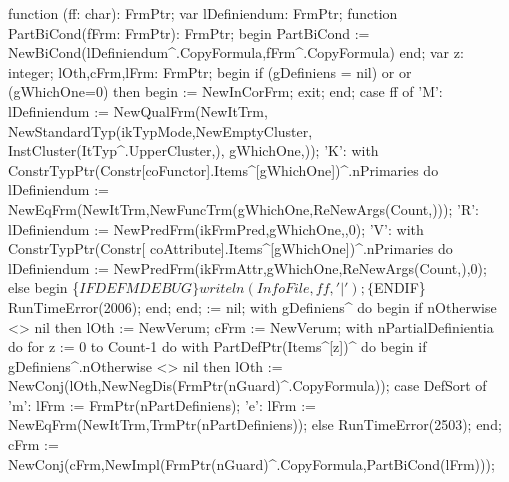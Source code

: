 \nwenddocs{}\endmoddef\nwstartdeflinemarkup{}\nwenddeflinemarkup
function (ff: char): FrmPtr;
var
   lDefiniendum: FrmPtr;
   function PartBiCond(fFrm: FrmPtr): FrmPtr;
   begin
      PartBiCond := NewBiCond(lDefiniendum^.CopyFormula,fFrm^.CopyFormula)
   end;
var
   z: integer;
   lOth,cFrm,lFrm: FrmPtr;
begin
   if (gDefiniens = nil) or  or (gWhichOne=0) then
   begin
       := NewInCorFrm;
      exit;
   end;
   case ff of
      'M':
         lDefiniendum := 
         NewQualFrm(NewItTrm,
                    NewStandardTyp(ikTypMode,NewEmptyCluster,
                                   InstCluster(ItTyp^.UpperCluster,),
                                   gWhichOne,));
      'K':
         with ConstrTypPtr(Constr[coFunctor].Items^[gWhichOne])^.nPrimaries do
         lDefiniendum := NewEqFrm(NewItTrm,NewFuncTrm(gWhichOne,ReNewArgs(Count,)));
      'R': lDefiniendum := NewPredFrm(ikFrmPred,gWhichOne,,0);
      'V':
         with ConstrTypPtr(Constr[ coAttribute].Items^[gWhichOne])^.nPrimaries do
         lDefiniendum := NewPredFrm(ikFrmAttr,gWhichOne,ReNewArgs(Count,),0);
      else
      begin
         \{$IFDEF MDEBUG\}
         writeln(InfoFile,ff,'|');
         \{$ENDIF\}
         RunTimeError(2006);
      end;
   end;
    := nil;
   with gDefiniens^ do
   begin
      if nOtherwise <> nil then lOth := NewVerum;
      cFrm := NewVerum;
      with nPartialDefinientia do
         for z := 0 to Count-1 do 
            with PartDefPtr(Items^[z])^ do
         begin
            if gDefiniens^.nOtherwise <> nil then
               lOth := NewConj(lOth,NewNegDis(FrmPtr(nGuard)^.CopyFormula));
            case DefSort of
               'm': lFrm := FrmPtr(nPartDefiniens);
               'e': lFrm := NewEqFrm(NewItTrm,TrmPtr(nPartDefiniens));
               else RunTimeError(2503);
            end;
            cFrm := NewConj(cFrm,NewImpl(FrmPtr(nGuard)^.CopyFormula,PartBiCond(lFrm)));
